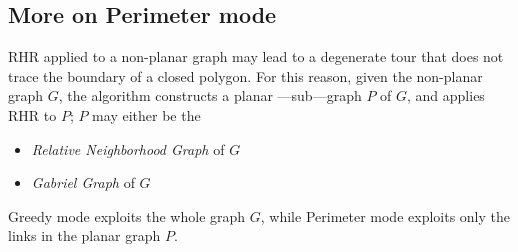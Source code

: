 
\subsection{More on Perimeter mode}
RHR applied to a non-planar graph may lead to a degenerate tour that does not trace the boundary of a closed polygon.
For this reason, given the non-planar graph $G$, the algorithm constructs a planar ---sub---graph $P$ of $G$, and applies RHR to $P$; 
$P$ may either be the
\begin{itemize}
   \item \textit{Relative Neighborhood Graph} of $G$
   \item \textit{Gabriel Graph} of $G$
\end{itemize}

Greedy mode exploits the whole graph $G$, while Perimeter mode exploits only the links in the planar graph $P$.